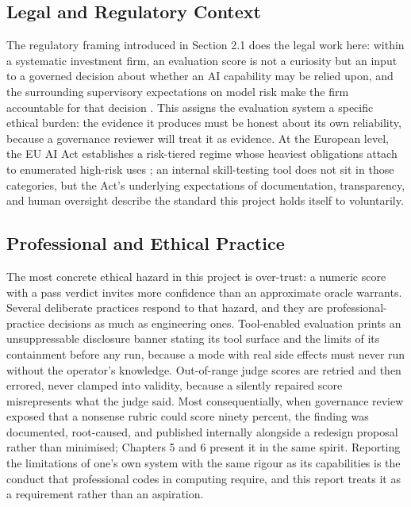 \subsection{Legal and Regulatory Context}
The regulatory framing introduced in Section 2.1 does the legal work here: within a systematic investment firm, an evaluation score is not a curiosity but an input to a governed decision about whether an AI capability may be relied upon, and the surrounding supervisory expectations on model risk make the firm accountable for that decision \cite{federalreserve2026sr262}\cite{bankofengland2022dp522}. This assigns the evaluation system a specific ethical burden: the evidence it produces must be honest about its own reliability, because a governance reviewer will treat it as evidence. At the European level, the EU AI Act establishes a risk-tiered regime whose heaviest obligations attach to enumerated high-risk uses \cite{eu2024aiact}; an internal skill-testing tool does not sit in those categories, but the Act's underlying expectations of documentation, transparency, and human oversight describe the standard this project holds itself to voluntarily.

\subsection{Professional and Ethical Practice}
The most concrete ethical hazard in this project is over-trust: a numeric score with a pass verdict invites more confidence than an approximate oracle warrants. Several deliberate practices respond to that hazard, and they are professional-practice decisions as much as engineering ones. Tool-enabled evaluation prints an unsuppressable disclosure banner stating its tool surface and the limits of its containment before any run, because a mode with real side effects must never run without the operator's knowledge. Out-of-range judge scores are retried and then errored, never clamped into validity, because a silently repaired score misrepresents what the judge said. Most consequentially, when governance review exposed that a nonsense rubric could score ninety percent, the finding was documented, root-caused, and published internally alongside a redesign proposal rather than minimised; Chapters 5 and 6 present it in the same spirit. Reporting the limitations of one's own system with the same rigour as its capabilities is the conduct that professional codes in computing require, and this report treats it as a requirement rather than an aspiration.


